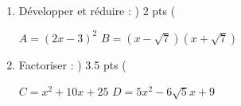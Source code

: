 \documentclass[10pt,a4paper]{article}
\newcommand{\lr}[1]{\left(#1\right)}
\newcommand{\lr}[1]{ \left(#1\right)}
\begin{document}
\begin{ascolorbox14}{}
\begin{exo}[colbacktitle=blue!40 ]{\textcolor{ white}{
{}}}
\vspace*{-0.008\linewidth}
\begin{enumerate}  \setlength{\itemsep}{-10pt}
\item Développer et réduire  : { \Timeffont \dotfill  } { \Maghrfont ) 2 \sfont pts  \Maghrfont ( } 
\vspace*{-0.02\linewidth}
\begin{tabenum} 
\tabenumitem[] \qquad \;
\tabenumitem[] \qquad \;
\tabenumitem[] \qquad \;
\tabenumitem[] $A=\lr{2x-3}^{2}$
\tabenumitem[**]
\tabenumitem[]  $B=\lr{x - \sqrt{7} } \lr{x + \sqrt{7}}$
\end{tabenum}
\vspace*{-0.008\linewidth}
\item Factoriser : { \Timeffont \dotfill  } { \Maghrfont ) 3.5 \sfont pts  \Maghrfont ( }
 \vspace*{-0.01\linewidth}
\begin{tabenum} 
\tabenumitem[] \qquad \;
\tabenumitem[] \qquad \;
\tabenumitem[] $ C = x^{2} + 10x + 25 $
\tabenumitem[**] 
\tabenumitem[] $ D = 5x^{2} - 6\sqrt{5}x + 9  $


\end{tabenum}
\end{enumerate}
\end{exo}
\end{ascolorbox14}
\end{document}
